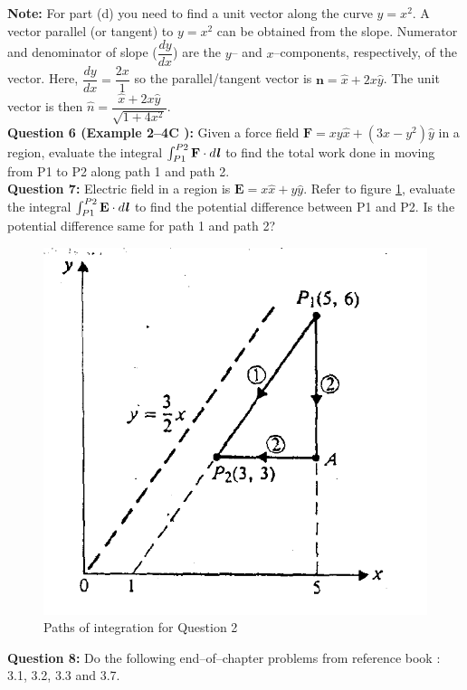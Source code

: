 \documentclass[12pt,a4paper]{article}
\begin{document}
\noindent\textbf{Note:} For part (d) you need to find a unit vector along the curve $y=x^2$. A vector parallel (or tangent) to $y=x^2$ can be obtained from the slope. Numerator and denominator of slope ($\dfrac{dy}{dx}$) are the $y$-- and $x$--components, respectively, of the vector. Here, $\dfrac{dy}{dx}=\dfrac{2x}{1}$ so the parallel/tangent vector is $\textbf{n}=\hat x+2x\hat y$. The unit vector is then $\hat n=\dfrac{\hat x+2x\hat y}{\sqrt{1+4x^2}}$.\\[0.2cm]
\noindent\textbf{Question 6 (Example 2--4C \cite[Example 2--4, page 23]{Cheng}):} Given a force field $\textbf{F}=xy\hat x+(3x-y^2)\hat y$ in a region, evaluate the integral $\int_{P1}^{P2}\textbf{F}\cdot d\textbf{\textit{l}}$ to find the total work done in moving from P1 to P2 along path 1 and path 2.\\[0.2cm]
\noindent\textbf{Question 7:} Electric field in a region is $\textbf{E}=x\hat x+y\hat y$. Refer to figure \ref{Cheng-integral}, evaluate the integral $\int_{P1}^{P2}\textbf{E}\cdot d\textbf{\textit{l}}$ to find the potential difference between P1 and P2. Is the potential difference same for path 1 and path 2?
\begin{figure}[H]
\centering
\includegraphics[scale=0.6]{Figure2-10Cheng.png}
\caption{Paths of integration for Question 2 \cite[Figure 2--10, page 23]{Cheng}}
\label{Cheng-integral}
\end{figure}
\noindent\textbf{Question 8:} Do the following end--of--chapter problems from reference book \cite[Page 93 and 94]{Sadiku}: 3.1, 3.2, 3.3 and 3.7.


\end{document}
